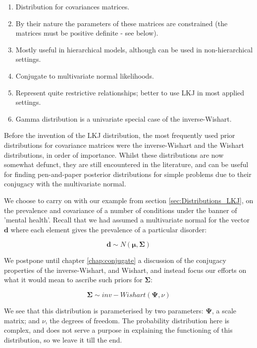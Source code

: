 \documentclass[11pt,fullpage]{book}
\begin{document}
\begin{enumerate}
\item Distribution for covariances matrices.
\item By their nature the parameters of these matrices are constrained (the matrices must be positive definite - see below).
\item Mostly useful in hierarchical models, although can be used in non-hierarchical settings.
\item Conjugate to multivariate normal likelihoods.
\item Represent quite restrictive relationships; better to use LKJ in most applied settings.
\item Gamma distribution is a univariate special case of the inverse-Wishart.
\end{enumerate}

Before the invention of the LKJ distribution, the most frequently used prior distributions for covariance matrices were the inverse-Wishart and the Wishart distributions, in order of importance. Whilst these distributions are now somewhat defunct, they are still encountered in the literature, and can be useful for finding pen-and-paper posterior distributions for simple problems due to their conjugacy with the multivariate normal. 

We choose to carry on with our example from section \ref{sec:Distributions_LKJ}, on the prevalence and covariance of a number of conditions under the banner of 'mental health'. Recall that we had assumed a multivariate normal for the vector $\boldsymbol{d}$ where each element gives the prevalence of a particular disorder:

\begin{equation}
\boldsymbol{d} \sim N(\boldsymbol{\mu},\boldsymbol{\Sigma})
\end{equation}

We postpone until chapter \ref{chap:conjugate} a discussion of the conjugacy properties of the inverse-Wishart, and Wishart, and instead focus our efforts on what it would mean to ascribe such priors for $\boldsymbol{\Sigma}$:

\begin{equation}
\boldsymbol{\Sigma} \sim inv-Wishart\left(\boldsymbol{\Psi},\nu\right)
\end{equation}

We see that this distribution is parameterised by two parameters: $\boldsymbol{\Psi}$, a scale matrix; and $\nu$, the degrees of freedom. The probability distribution here is complex, and does not serve a purpose in explaining the functioning of this distribution, so we leave it till the end.
\end{document}
